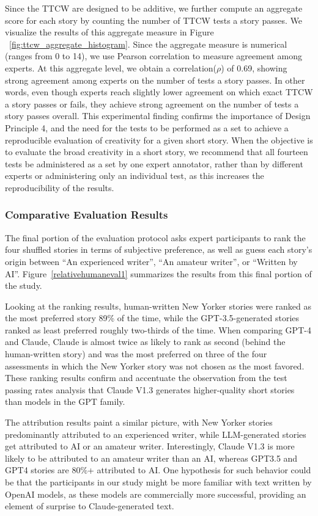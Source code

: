 Since the TTCW are designed to be additive, we further compute an aggregate score for each story by counting the number of TTCW tests a story passes. We visualize the results of this aggregate measure in Figure ~\ref{fig:ttcw_aggregate_histogram}. Since the aggregate measure is numerical (ranges from 0 to 14), we use Pearson correlation to measure agreement among experts. At this aggregate level, we obtain a correlation($\rho$) of 0.69, showing strong agreement among experts on the number of tests a story passes. In other words, even though experts reach slightly lower agreement on which exact TTCW a story passes or fails, they achieve strong agreement on the number of tests a story passes overall. This experimental finding confirms the importance of Design Principle 4, and the need for the tests to be performed as a set to achieve a reproducible evaluation of creativity for a given short story. When the objective is to evaluate the broad creativity in a short story, we recommend that all fourteen tests be administered as a set by one expert annotator, rather than by different experts or administering only an individual test, as this increases the reproducibility of the results.
\subsubsection{Comparative Evaluation Results}

The final portion of the evaluation protocol asks expert participants to rank the four shuffled stories in terms of subjective preference, as well as guess each story's origin between ``An experienced writer'', ``An amateur writer'', or ``Written by AI''. Figure~\ref{relativehumaneval1} summarizes the results from this final portion of the study.

Looking at the ranking results, human-written New Yorker stories were ranked as the most preferred story 89\% of the time, while the GPT-3.5-generated stories ranked as least preferred roughly two-thirds of the time. When comparing GPT-4 and Claude, Claude is almost twice as likely to rank as second (behind the human-written story) and was the most preferred on three of the four assessments in which the New Yorker story was not chosen as the most favored. These ranking results confirm and accentuate the observation from the test passing rates analysis that Claude V1.3 generates higher-quality short stories than models in the GPT family.

The attribution results paint a similar picture, with New Yorker stories predominantly attributed to an experienced writer, while LLM-generated stories get attributed to AI or an amateur writer. Interestingly, Claude V1.3 is more likely to be attributed to an amateur writer than an AI, whereas GPT3.5 and GPT4 stories are 80\%+ attributed to AI. One hypothesis for such behavior could be that the participants in our study might be more familiar with text written by OpenAI models, as these models are commercially more successful, providing an element of surprise to Claude-generated text.

